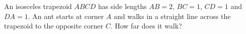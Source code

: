 An isosceles trapezoid $ABCD$ has side lengths $AB=2$, $BC=1$, $CD=1$ and $DA=1$. An ant starts at corner $A$ and walks in a straight line across the trapezoid to the opposite corner $C$. How far does it walk?
